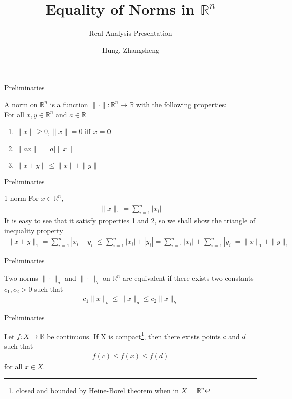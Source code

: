\documentclass[10pt,appendixnumberbeamer]{beamer}
\title{Equality of Norms in $\mathbb{R}^n$}
\subtitle{Real Analysis Presentation}
\author{Hung, Zhangsheng}
\date{}
\begin{document}
\begin{frame}
\titlepage
\end{frame}




\begin{frame}{Preliminaries}
\begin{definition}
A norm on $\mathbb{R}^n$ is a function $\|\cdot\|:\mathbb{R}^n \to \mathbb{R}$ with the following properties:\\
For all $x, y \in \mathbb{R}^n$ and $a \in \mathbb{R}$
\begin{enumerate}[1.]
\item $\|x\| \geq 0, \|x\| = 0$ iff $x=\mathbf{0}$
\item $\|ax\| = |a| \|x\|$
\item $\|x+y\| \leq \|x\|+\|y\|$
\end{enumerate}
\end{definition}
\end{frame}

\begin{frame}{Preliminaries}
\begin{block}{1-norm}
For $x \in \mathbb{R}^n$,
\begin{align*}
\|x\|_1 = \sum_{i=1}^{n} |x_i|
\end{align*}
It is easy to see that it satisfy properties 1 and 2, so we shall show the triangle of inequality property
\begin{align*}
\|x+y\|_1 =  \sum_{i=1}^{n} |x_i+y_i| \leq \sum_{i=1}^{n} |x_i|+|y_i| = \sum_{i=1}^{n} |x_i|+ \sum_{i=1}^{n} |y_i| = \|x\|_1+\|y\|_1
\end{align*}
\end{block}
\end{frame}

\begin{frame}{Preliminaries}
\begin{definition}
Two norms $\|\cdot\|_a$ and $\|\cdot\|_b$ on $\mathbb{R}^n$ are equivalent if there exists two constants $c_1, c_2 >0$ such that
\begin{align*}
c_1\|x\|_b \leq \|x\|_a \leq c_2\|x\|_b
\end{align*} 
\end{definition}
\end{frame}

\begin{frame}{Preliminaries}
\begin{theorem}
Let $f : X \to \mathbb{R}$ be continuous. If X is compact\footnote{closed and bounded by Heine-Borel theorem when in $X=\mathbb{R}^n$}, then there exists points $c$ and $d$ such that 
\begin{align*}
f(c) \leq f(x) \leq f(d)
\end{align*}
 for all $x \in X$.
\end{theorem}
\end{frame}
\end{document}
